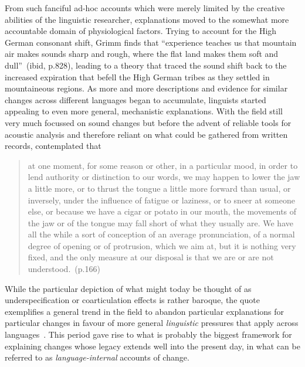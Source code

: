 From such fanciful ad-hoc accounts which were merely limited by the creative abilities of the linguistic researcher,
explanations moved to the somewhat more accountable domain of physiological factors. Trying to account for the High German consonant shift, Grimm finds that ``experience teaches us that mountain air makes sounds sharp and rough, where the flat land makes them soft and dull''~(ibid, p.828), leading to a theory that traced the sound shift back to the increased expiration that befell the High German tribes as they settled in mountaineous regions. As more and more descriptions and evidence for similar changes across different languages began to accumulate, linguists started appealing to even more general, mechanistic explanations.
With the field still very much focussed on sound changes but before the advent of reliable tools for acoustic analysis and therefore reliant on what could be gathered from written records, \citet{Jespersen1922} contemplated that

\begin{quote}
at one moment, for some reason or other, in a particular mood, in order to lend authority or distinction to our words, we may happen to lower the jaw a little more, or to thrust the tongue a little more forward than usual, or inversely, under the influence of fatigue or laziness, or to sneer at someone else, or because we have a cigar or potato in our mouth, the movements of the jaw or of the tongue may fall short of what they usually are. We have all the while a sort of conception of an average pronunciation, of a normal degree of opening or of protrusion, which we aim at, but it is nothing very fixed, and the only measure at our disposal is that we are or are not understood.~(p.166)
\end{quote}

While the particular depiction of what might today be thought of as underspecification or coarticulation effects is rather baroque, the quote exemplifies a general trend in the field to abandon particular explanations for particular changes in favour of more general \emph{linguistic} pressures that apply across languages~\citep[see also][ch.21]{Bloomfield1933}. This period gave rise to what is probably the biggest framework for explaining changes whose legacy extends well into the present day, in what can be referred to as \emph{language-internal} accounts of change.

